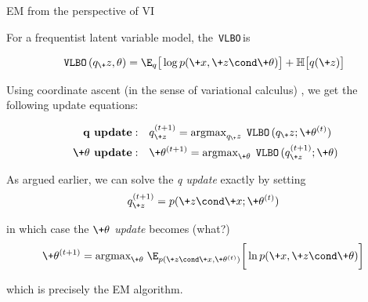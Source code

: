 \documentclass[10pt]{beamer}
\newcommand{\VLBO}{\,\texttt{VLBO}\,}
\begin{document}
\begin{frame}{EM from the perspective of VI}

 
 
For a frequentist latent variable model, the \VLBO is 

\begin{equation*} 
\VLBO(q_\+z, \theta) = \E_q \big[ \log p(\+x, \+z \cond \+\theta) \big]  +  \mathbb{H} \big[q(\+z) \big]  %
\end{equation*}


\pause 

Using coordinate ascent \tiny (in the sense of variational calculus) \normalsize ,  we get the following update equations: 

\begin{align}
\textbf{q update}: \quad & q_{\+z}^{(t+1)} = \text{argmax}_{q_\+z} \; \VLBO (q_\+z ; \+\theta^{(t)} ) \label{q_update} \\
\textbf{ $\+\theta$ update}: \quad & \+\theta^{(t+1)} = \text{argmax}_{\+\theta} \; \VLBO (q_{\+z}^{(t+1)} ; \+\theta )\label{theta_update} 
\end{align} 

\pause
 
As argued earlier, we can solve the \textit{q update} exactly by setting   
\[ q_{\+z}^{(t+1)} =   p(\+z \cond \+x; \+\theta^{(t)})\]  
 
in which case the \textit{ $\+\theta$ update} becomes  \tiny (what?) \normalsize \pause 
\begin{equation}
 \+\theta^{(t+1)} =  \text{argmax}_{\+\theta} \; \E_{p(\+z \cond \+x , \+\theta^{(t)})} \bigg[ \ln p(\+x, \+z \cond \+\theta) \bigg] \label{EM}
\end{equation}
 
which is precisely the EM algorithm. 


\end{frame}
\end{document}
